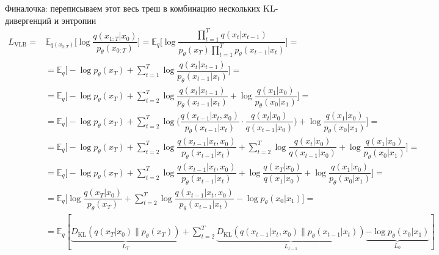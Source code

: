 Финалочка: переписываем этот весь треш в комбинацию нескольких KL-дивергенций и энтропии
\[
\begin{aligned}
    L_\text{VLB} = &\mathbb{E}_{q(x_{0:T})} \Big[ \log\dfrac{q(x_{1:T}|x_0)}{p_\theta(x_{0:T})} \Big] = \mathbb{E}_q \Big[ \log\dfrac{\prod_{t=1}^T q(x_t|x_{t-1})}{ p_\theta(x_T) \prod_{t=1}^T p_\theta(x_{t-1} |x_t) } \Big] = \\
    &= \mathbb{E}_q \Big[ -\log p_\theta(x_T) + \sum_{t=1}^T \log \dfrac{q(x_t|x_{t-1})}{p_\theta(x_{t-1} |x_t)} \Big] = \\
    &= \mathbb{E}_q \Big[ -\log p_\theta(x_T) + \sum_{t=2}^T \log \dfrac{q(x_t|x_{t-1})}{p_\theta(x_{t-1} |x_t)} + \log\dfrac{q(x_1 | x_0)}{p_\theta(x_0 | x_1)} \Big] = \\
    &= \mathbb{E}_q \Big[ -\log p_\theta(x_T) + \sum_{t=2}^T \log \Big( \dfrac{q(x_{t-1} | x_t, x_0)}{p_\theta(x_{t-1} |x_t)}\cdot \dfrac{q(x_t | x_0)}{q(x_{t-1}|x_0)} \Big) + \log \dfrac{q(x_1 | x_0)}{p_\theta(x_0 | x_1)} \Big] = \\
    &= \mathbb{E}_q \Big[ -\log p_\theta(x_T) + \sum_{t=2}^T \log \dfrac{q(x_{t-1} | x_t, x_0)}{p_\theta(x_{t-1} |x_t)} + \sum_{t=2}^T \log \dfrac{q(x_t | x_0)}{q(x_{t-1} | x_0)} + \log\dfrac{q(x_1 | x_0)}{p_\theta(x_0 | x_1)} \Big] = \\
    &= \mathbb{E}_q \Big[ -\log p_\theta(x_T) + \sum_{t=2}^T \log \dfrac{q(x_{t-1} | x_t, x_0)}{p_\theta(x_{t-1} |x_t)} + \log\dfrac{q(x_T | x_0)}{q(x_1 | x_0)} + \log \dfrac{q(x_1 | x_0)}{p_\theta(x_0 | x_1)} \Big] =\\
    &= \mathbb{E}_q \Big[ \log\dfrac{q(x_T | x_0)}{p_\theta(x_T)} + \sum_{t=2}^T \log \dfrac{q(x_{t-1} | x_t, x_0)}{p_\theta(x_{t-1} |x_t)} - \log p_\theta(x_0 | x_1) \Big] = \\
    &= \mathbb{E}_q [\underbrace{D_\text{KL}(q(x_T | x_0) \parallel p_\theta(x_T))}_{L_T} + \sum_{t=2}^T \underbrace{D_\text{KL}(q(x_{t-1} | x_t, x_0) \parallel p_\theta(x_{t-1} |x_t))}_{L_{t-1}} \underbrace{- \log p_\theta(x_0 | x_1)}_{L_0} ]
\end{aligned}
\]

% 
% 
% 
% 

% 